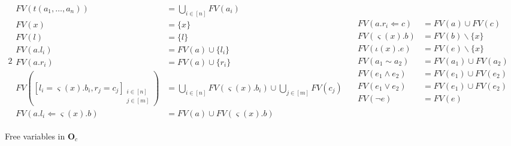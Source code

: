 \begin{figure*}[h]
  \centering
  \begin{alignat*}{2}
    \begin{aligned}
      FV(t(a_1 , \ldots , a_n)) & = \bigcup_{i \in [n]} FV(a_i)\\
      FV(x) & = \{x\}\\
      FV(l) & = \{l\}\\
      FV(a.l_i) & = FV(a) \cup \{l_i\}\\
      FV(a.r_i) & = FV(a) \cup \{r_i\}\\
      FV([l_i = \varsigma(x) . b_i , r_j = c_j]_{\substack{i \in [n]\\j \in [m]}})
      & = \bigcup_{i \in [n]} FV(\varsigma(x) . b_i) \cup \bigcup_{j \in [m]} FV(c_j)\\
      FV(a.l_i \Leftarrow \varsigma(x) . b) & = FV(a) \cup FV(\varsigma(x) . b)
    \end{aligned}
    \quad
    \begin{aligned}
      FV(a.r_i \Leftarrow c) & = FV(a) \cup FV(c)\\
      FV(\varsigma(x) . b) & = FV(b) \backslash \{x\}\\
      FV(\iota (x) . e) & = FV(e) \backslash \{x\}\\
      FV(a_1 \sim a_2) & = FV(a_1) \cup FV(a_2)\\
      FV(e_1 \land e_2) & = FV (e_1) \cup FV(e_2)\\
      FV(e_1 \vee e_2) & = FV (e_1) \cup FV(e_2)\\
      FV(\neg e) & = FV (e)
    \end{aligned}
  \end{alignat*}
  \caption{Free variables in $\textbf{O}_c$}
  \label{Oc:fv}
\end{figure*}

